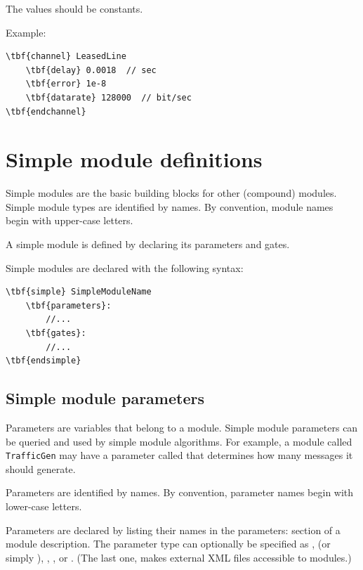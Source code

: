 The values should be constants.

Example:

\begin{Verbatim}[commandchars=\\\{\}]
\tbf{channel} LeasedLine
    \tbf{delay} 0.0018  // sec
    \tbf{error} 1e-8
    \tbf{datarate} 128000  // bit/sec
\tbf{endchannel}
\end{Verbatim}



\section{Simple module definitions}


Simple modules are the basic building blocks for other (compound)
modules. Simple module types are identified by names.
By convention, module names begin with upper-case letters.

A simple module is defined by
declaring its parameters and
gates.

Simple modules are declared with the following syntax:

\begin{Verbatim}[commandchars=\\\{\}]
\tbf{simple} SimpleModuleName
    \tbf{parameters}:
        //...
    \tbf{gates}:
        //...
\tbf{endsimple}
\end{Verbatim}



\subsection{Simple module parameters}
\label{sec:ch-ned-lang:simple-module-param}


Parameters are variables that belong to a module. Simple module
parameters can be queried and used by simple module algorithms.
For example, a module called \texttt{TrafficGen} may have a parameter
called  that determines how many messages it
should generate.

Parameters are identified by names.
By convention, parameter names begin with lower-case letters.

Parameters are declared by listing their names in the
parameters: section of a
module description. The parameter type can optionally be specified as
, 
(or simply ),
, , or
. (The last one,  makes external XML files
accessible to modules.)


